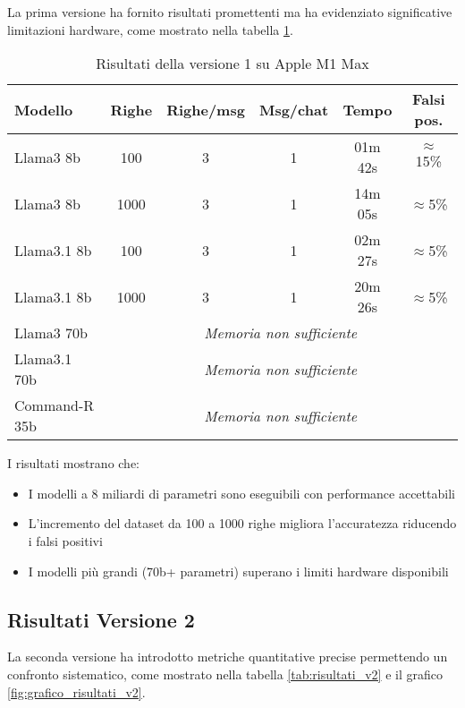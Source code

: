 \documentclass[12pt]{report}
\begin{document}
La prima versione ha fornito risultati promettenti ma ha evidenziato significative limitazioni hardware, come mostrato nella tabella \ref{tab:risultati_v1}.

\begin{table}[h!]
    \centering
    \begin{tabular}{|l|c|c|c|c|c|}
        \hline
        \textbf{Modello} & \textbf{Righe} & \textbf{Righe/msg} & \textbf{Msg/chat} & \textbf{Tempo} & \textbf{Falsi pos.} \\ \hline
        Llama3 8b & 100 & 3 & 1 & 01m 42s & $\approx$15\% \\ \hline
        Llama3 8b & 1000 & 3 & 1 & 14m 05s & $\approx$5\% \\ \hline
        Llama3.1 8b & 100 & 3 & 1 & 02m 27s & $\approx$5\% \\ \hline
        Llama3.1 8b & 1000 & 3 & 1 & 20m 26s & $\approx$5\% \\ \hline
        Llama3 70b & \multicolumn{5}{c|}{\textit{Memoria non sufficiente}} \\ \hline
        Llama3.1 70b & \multicolumn{5}{c|}{\textit{Memoria non sufficiente}} \\ \hline
        Command-R 35b & \multicolumn{5}{c|}{\textit{Memoria non sufficiente}} \\ \hline
    \end{tabular}
    \caption{Risultati della versione 1 su Apple M1 Max}
    \label{tab:risultati_v1}
\end{table}

I risultati mostrano che:
\begin{itemize}
    \item I modelli a 8 miliardi di parametri sono eseguibili con performance accettabili
    \item L'incremento del dataset da 100 a 1000 righe migliora l'accuratezza riducendo i falsi positivi
    \item I modelli più grandi (70b+ parametri) superano i limiti hardware disponibili
\end{itemize}

\subsection{Risultati Versione 2}
\label{subsec:risultati_v2}

La seconda versione ha introdotto metriche quantitative precise permettendo un confronto sistematico, come mostrato nella tabella \ref{tab:risultati_v2} e il grafico \ref{fig:grafico_risultati_v2}.
\end{document}
